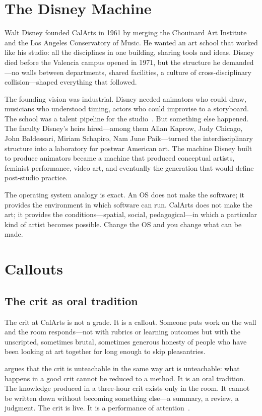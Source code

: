 \documentclass[10pt,letterpaper,twocolumn]{article}
\begin{document}
\section{The Disney Machine}

Walt Disney founded CalArts in 1961 by merging the Chouinard Art Institute and the Los Angeles Conservatory of Music. He wanted an art school that worked like his studio: all the disciplines in one building, sharing tools and ideas. Disney died before the Valencia campus opened in 1971, but the structure he demanded---no walls between departments, shared facilities, a culture of cross-disciplinary collision---shaped everything that followed.

The founding vision was industrial. Disney needed animators who could draw, musicians who understood timing, actors who could improvise to a storyboard. The school was a talent pipeline for the studio~\citep{singerman1999art}. But something else happened. The faculty Disney's heirs hired---among them Allan Kaprow, Judy Chicago, John Baldessari, Miriam Schapiro, Nam June Paik---turned the interdisciplinary structure into a laboratory for postwar American art. The machine Disney built to produce animators became a machine that produced conceptual artists, feminist performance, video art, and eventually the generation that would define post-studio practice.

The operating system analogy is exact. An OS does not make the software; it provides the environment in which software can run. CalArts does not make the art; it provides the conditions---spatial, social, pedagogical---in which a particular kind of artist becomes possible. Change the OS and you change what can be made.

\section{Callouts}

\subsection{The crit as oral tradition}

The crit at CalArts is not a grade. It is a callout. Someone puts work on the wall and the room responds---not with rubrics or learning outcomes but with the unscripted, sometimes brutal, sometimes generous honesty of people who have been looking at art together for long enough to skip pleasantries.

\citet{elkins2001why} argues that the crit is unteachable in the same way art is unteachable: what happens in a good crit cannot be reduced to a method. It is an oral tradition. The knowledge produced in a three-hour crit exists only in the room. It cannot be written down without becoming something else---a summary, a review, a judgment. The crit is live. It is a performance of attention~\citep{hooks1994teaching}.
\end{document}
